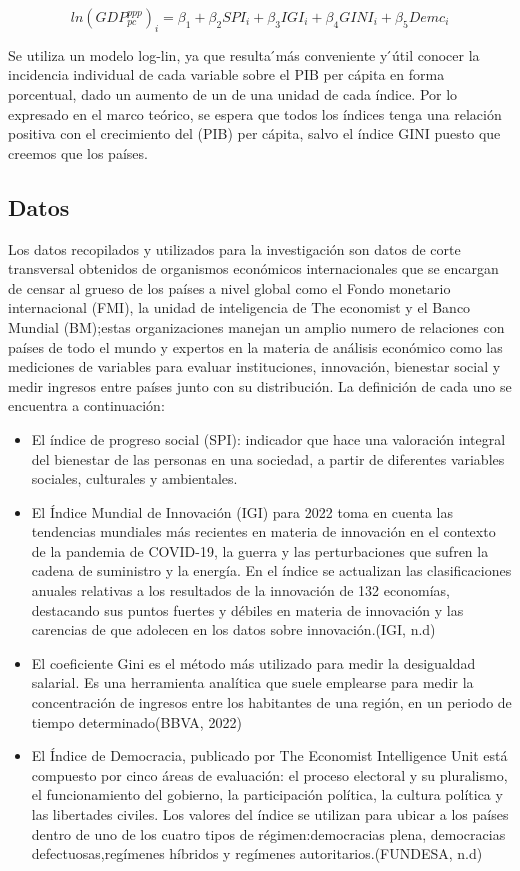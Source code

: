 \documentclass[11pt]{article}
\begin{document}
{$$ ln(GDP_{pc}^{ppp})_i = \beta_1 + \beta_2 SPI_i + \beta_3 IGI_i + \beta_4 GINI_i + \beta_5 Demc_i $$

Se utiliza un modelo log-lin, ya que resulta ́más conveniente y  ́útil conocer la incidencia
individual de cada variable sobre el PIB per cápita en forma porcentual, dado un aumento de un de una unidad de cada índice. Por lo expresado en el marco teórico, se espera que todos los índices  tenga una relación positiva con el crecimiento del (PIB) per cápita, salvo el índice GINI puesto que creemos que los países.

 
\subsection{Datos}

 Los datos recopilados y utilizados para la investigación son datos de corte transversal obtenidos de organismos económicos internacionales que se encargan de censar al grueso de los países a nivel global como el Fondo monetario internacional (FMI), la unidad de inteligencia de The economist y el Banco Mundial (BM);estas organizaciones manejan un amplio numero de relaciones con países de todo el mundo y expertos en la materia de análisis económico como las mediciones de variables para evaluar instituciones, innovación, bienestar social y medir ingresos entre países junto con su distribución. La definición de cada uno se encuentra a continuación:
 
\begin{itemize}
    \item El índice de progreso social (SPI): indicador que hace una valoración integral del bienestar de las personas en una sociedad, a partir de diferentes variables sociales, culturales y ambientales.
     \item El Índice Mundial de Innovación (IGI) para 2022 toma en cuenta las tendencias mundiales más recientes en materia de innovación en el contexto de la pandemia de COVID-19, la guerra y las perturbaciones que sufren la cadena de suministro y la energía. En el índice se actualizan las clasificaciones anuales relativas a los resultados de la innovación de 132 economías, destacando sus puntos fuertes y débiles en materia de innovación y las carencias de que adolecen en los datos sobre innovación.(IGI, n.d)
    \item El coeficiente Gini es el método más utilizado para medir la desigualdad salarial. Es una herramienta analítica que suele emplearse para medir la concentración de ingresos entre los habitantes de una región, en un periodo de tiempo determinado(BBVA, 2022)
    \item   El Índice de Democracia, publicado por The Economist Intelligence Unit está compuesto por cinco áreas de evaluación: el proceso electoral y su pluralismo, el funcionamiento del gobierno, la participación política, la cultura política y las libertades civiles. Los valores del índice se utilizan para ubicar a los países dentro de uno de los cuatro tipos de régimen:democracias plena, democracias defectuosas,regímenes híbridos y regímenes autoritarios.(FUNDESA, n.d)
\end{itemize}
 
}
\end{document}

